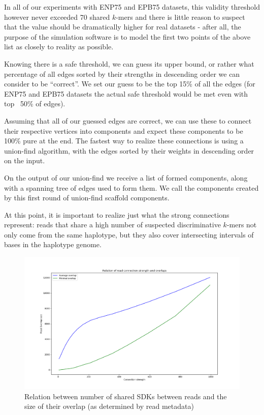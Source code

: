 In all of our experiments with ENP75 and EPB75 datasets, this validity threshold however never exceeded 70 shared $k$-mers and there is little reason to suspect that the value should be dramatically higher for real datasets - after all, the purpose of the simulation software is to model the first two points of the above list as closely to reality as possible.

Knowing there is a safe threshold, we can guess its upper bound, or rather what percentage of all edges sorted by their strengths in descending order we can consider to be “correct”. We set our guess to be the top 15\% of all the edges (for ENP75 and EPB75 datasets the actual safe threshold would be met even with top ~50\% of edges).

Assuming that all of our guessed edges are correct, we can use these to connect their respective vertices into components and expect these components to be 100\% pure at the end. The fastest way to realize these connections is using a union-find algorithm, with the edges sorted by their weights in descending order on the input.

On the output of our union-find we receive a list of formed components, along with a spanning tree of edges used to form them. We call the components created by this first round of union-find scaffold components.

At this point, it is important to realize just what the strong connections represent: reads that share a high number of suspected discriminative $k$-mers not only come from the same haplotype, but they also cover intersecting intervals of bases in the haplotype genome.

\begin{figure}
\includegraphics[width=400bp]{figures/overlap_relation.png}
\caption{Relation between number of shared SDKs between reads and the size of their overlap (as determined by read metadata)}
\label{fig:overlap_relation}
\end{figure}

